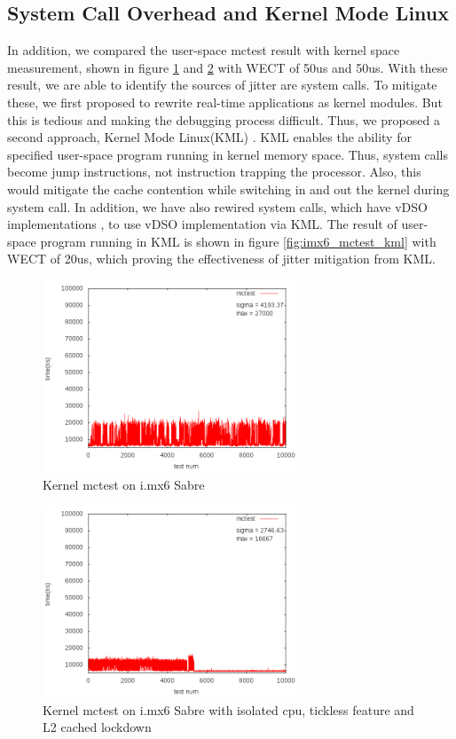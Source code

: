 \documentclass[conference]{IEEEtran}
\begin{document}
\subsection{System Call Overhead and Kernel Mode Linux}

    In addition, we compared the user-space mctest result with kernel space measurement, shown in figure
    \ref{fig:imx6_mctest_k_v} and \ref{fig:imx6_mctest_k_lock} with WECT of 50us and 50us. With these result, we are
    able to identify the sources of jitter are system calls. To mitigate these, we first proposed to rewrite real-time
    applications as kernel modules. But this is tedious and making the debugging process difficult. Thus, we proposed a
    second approach, Kernel Mode Linux(KML) \cite{KML} \cite{KMLConf}. KML enables the ability for specified user-space
    program running in kernel memory space. Thus, system calls become jump instructions, not instruction trapping the
    processor. Also, this would mitigate the cache contention while switching in and out the kernel during system call.
    In addition, we have also rewired system calls, which have vDSO implementations \cite{vDSO}, to use vDSO
    implementation via KML. The result of user-space program running in KML is shown in figure \ref{fig:imx6_mctest_kml}
    with WECT of 20us, which proving the effectiveness of jitter mitigation from KML.

    \begin{figure} \centering \includegraphics[width=3in]{img/mctest-k-none.png} \caption{Kernel mctest on i.mx6 Sabre}
    \label{fig:imx6_mctest_k_v} \end{figure}
    
    \begin{figure} \centering \includegraphics[width=3in]{img/mctest-k-lock.png} \caption{Kernel mctest on i.mx6 Sabre
    with isolated cpu, tickless feature and L2 cached lockdown} \label{fig:imx6_mctest_k_lock} \end{figure}
    
\end{document}
